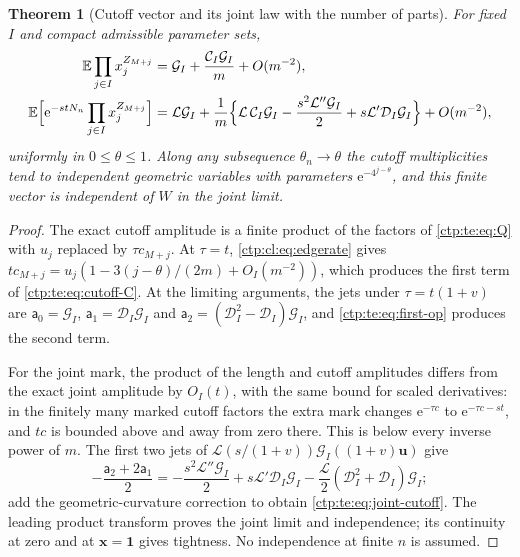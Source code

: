 \documentclass[11pt,a4paper]{article}
\numberwithin{equation}{section}
\newtheorem{theorem}{Theorem}[section]
\theoremstyle{definition}
\theoremstyle{remark}
\newcommand{\e}{\mathrm e}
\newcommand{\E}{\mathbb E}
\newcommand{\LW}{\mathcal L}
\begin{document}
\begin{theorem}[Cutoff vector and its joint law with the number of parts]\label{ctp:te:thm:cutoff}
For fixed $I$ and compact admissible parameter sets,
\begin{align}
 \E\prod_{j\in I}x_j^{Z_{M+j}}&=\mathcal G_I+\frac{\mathcal C_I\mathcal G_I}m+O(m^{-2}),
 \label{ctp:te:eq:cutoff-law}\\
 \E\Bigl[\e^{-stN_n}\prod_{j\in I}x_j^{Z_{M+j}}\Bigr]&=\LW\mathcal G_I
 +\frac1m\Bigl\{\LW\,\mathcal C_I\mathcal G_I-\frac{s^2\LW''\mathcal G_I}2
 +s\LW'\mathcal D_I\mathcal G_I\Bigr\}+O(m^{-2}),\label{ctp:te:eq:joint-cutoff}
\end{align}
uniformly in $0\le\theta\le1$. Along any subsequence $\theta_n\to\theta$
the cutoff multiplicities tend to independent geometric variables with
parameters $\e^{-4^{j-\theta}}$, and this finite vector is independent of
$W$ in the joint limit.
\end{theorem}
\begin{proof}
The exact cutoff amplitude is a finite product of the factors of
\eqref{ctp:te:eq:Q} with $u_j$ replaced by $\tau c_{M+j}$. At $\tau=t$,
\eqref{ctp:cl:eq:edgerate} gives $tc_{M+j}=u_j(1-3(j-\theta)/(2m)+O_I(m^{-2}))$,
which produces the first term of \eqref{ctp:te:eq:cutoff-C}. At the limiting
arguments, the jets under $\tau=t(1+v)$ are $\mathsf a_0=\mathcal G_I$,
$\mathsf a_1=\mathcal D_I\mathcal G_I$ and
$\mathsf a_2=(\mathcal D_I^2-\mathcal D_I)\mathcal G_I$, and
\eqref{ctp:te:eq:first-op} produces the second term.

For the joint mark, the product of the length and cutoff amplitudes differs
from the exact joint amplitude by $O_I(t)$, with the same bound for scaled
derivatives: in the finitely many marked cutoff factors the extra mark
changes $\e^{-\tau c}$ to $\e^{-\tau c-st}$, and $tc$ is bounded above and
away from zero there. This is below every inverse power of $m$. The first
two jets of $\LW(s/(1+v))\mathcal G_I((1+v)\mathbf u)$ give
\[
 -\frac{\mathsf a_2+2\mathsf a_1}2=-\frac{s^2\LW''\mathcal G_I}2+s\LW'\mathcal D_I\mathcal G_I
 -\frac{\LW}2(\mathcal D_I^2+\mathcal D_I)\mathcal G_I;
\]
add the geometric-curvature correction to obtain \eqref{ctp:te:eq:joint-cutoff}.
The leading product transform proves the joint limit and independence; its
continuity at zero and at $\mathbf x=\mathbf1$ gives tightness. No
independence at finite $n$ is assumed.
\end{proof}
\end{document}
